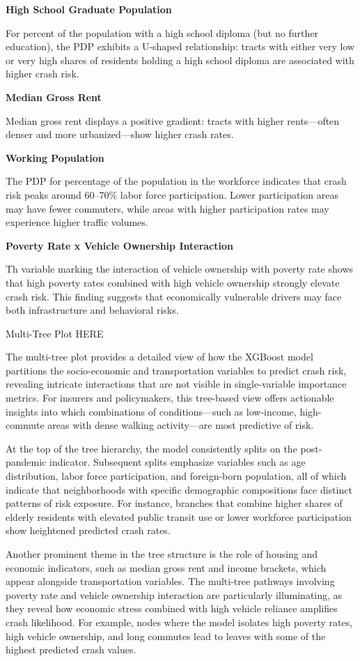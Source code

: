 \documentclass[
  number,
  review,
  3p]{elsarticle}
\begin{document}
\textbf{High School Graduate Population}

For percent of the population with a high school diploma (but no further
education), the PDP exhibits a U-shaped relationship: tracts with either
very low or very high shares of residents holding a high school diploma
are associated with higher crash risk.

\textbf{Median Gross Rent}

Median gross rent displays a positive gradient: tracts with higher
rents---often denser and more urbanized---show higher crash rates.

\textbf{Working Population}

The PDP for percentage of the population in the workforce indicates that
crash risk peaks around 60--70\% labor force participation. Lower
participation areas may have fewer commuters, while areas with higher
participation rates may experience higher traffic volumes.

\textbf{Poverty Rate x Vehicle Ownership Interaction}

Th variable marking the interaction of vehicle ownership with poverty
rate shows that high poverty rates combined with high vehicle ownership
strongly elevate crash risk. This finding suggests that economically
vulnerable drivers may face both infrastructure and behavioral risks.

Multi-Tree Plot HERE

The multi-tree plot provides a detailed view of how the XGBoost model
partitions the socio-economic and transportation variables to predict
crash risk, revealing intricate interactions that are not visible in
single-variable importance metrics. For insurers and policymakers, this
tree-based view offers actionable insights into which combinations of
conditions---such as low-income, high-commute areas with dense walking
activity---are most predictive of risk.

At the top of the tree hierarchy, the model consistently splits on the
post-pandemic indicator. Subsequent splits emphasize variables such as
age distribution, labor force participation, and foreign-born
population, all of which indicate that neighborhoods with specific
demographic compositions face distinct patterns of risk exposure. For
instance, branches that combine higher shares of elderly residents with
elevated public transit use or lower workforce participation show
heightened predicted crash rates.

Another prominent theme in the tree structure is the role of housing and
economic indicators, such as median gross rent and income brackets,
which appear alongside transportation variables. The multi-tree pathways
involving poverty rate and vehicle ownership interaction are
particularly illuminating, as they reveal how economic stress combined
with high vehicle reliance amplifies crash likelihood. For example,
nodes where the model isolates high poverty rates, high vehicle
ownership, and long commutes lead to leaves with some of the highest
predicted crash values.
\end{document}
